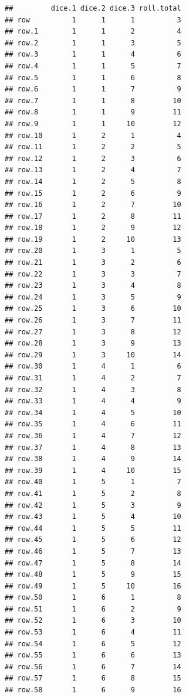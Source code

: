 \documentclass[
]{article}
\begin{document}
\begin{verbatim}
##         dice.1 dice.2 dice.3 roll.total
## row          1      1      1          3
## row.1        1      1      2          4
## row.2        1      1      3          5
## row.3        1      1      4          6
## row.4        1      1      5          7
## row.5        1      1      6          8
## row.6        1      1      7          9
## row.7        1      1      8         10
## row.8        1      1      9         11
## row.9        1      1     10         12
## row.10       1      2      1          4
## row.11       1      2      2          5
## row.12       1      2      3          6
## row.13       1      2      4          7
## row.14       1      2      5          8
## row.15       1      2      6          9
## row.16       1      2      7         10
## row.17       1      2      8         11
## row.18       1      2      9         12
## row.19       1      2     10         13
## row.20       1      3      1          5
## row.21       1      3      2          6
## row.22       1      3      3          7
## row.23       1      3      4          8
## row.24       1      3      5          9
## row.25       1      3      6         10
## row.26       1      3      7         11
## row.27       1      3      8         12
## row.28       1      3      9         13
## row.29       1      3     10         14
## row.30       1      4      1          6
## row.31       1      4      2          7
## row.32       1      4      3          8
## row.33       1      4      4          9
## row.34       1      4      5         10
## row.35       1      4      6         11
## row.36       1      4      7         12
## row.37       1      4      8         13
## row.38       1      4      9         14
## row.39       1      4     10         15
## row.40       1      5      1          7
## row.41       1      5      2          8
## row.42       1      5      3          9
## row.43       1      5      4         10
## row.44       1      5      5         11
## row.45       1      5      6         12
## row.46       1      5      7         13
## row.47       1      5      8         14
## row.48       1      5      9         15
## row.49       1      5     10         16
## row.50       1      6      1          8
## row.51       1      6      2          9
## row.52       1      6      3         10
## row.53       1      6      4         11
## row.54       1      6      5         12
## row.55       1      6      6         13
## row.56       1      6      7         14
## row.57       1      6      8         15
## row.58       1      6      9         16

\end{verbatim}
\end{document}
